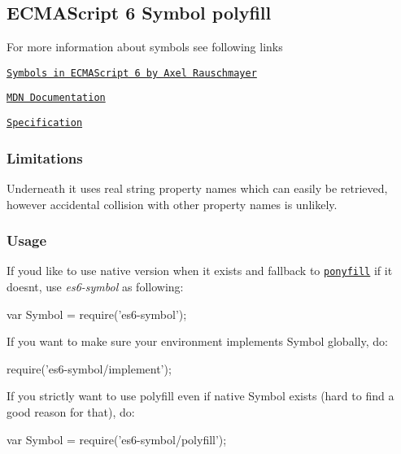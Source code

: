 \subsection*{E\+C\+M\+A\+Script 6 Symbol polyfill}

For more information about symbols see following links
\begin{DoxyItemize}
\item \href{http://www.2ality.com/2014/12/es6-symbols.html}{\tt Symbols in E\+C\+M\+A\+Script 6 by Axel Rauschmayer}
\item \href{https://developer.mozilla.org/en-US/docs/Web/JavaScript/Reference/Global_Objects/Symbol}{\tt M\+DN Documentation}
\item \href{http://people.mozilla.org/~jorendorff/es6-draft.html#sec-symbol-constructor}{\tt Specification}
\end{DoxyItemize}

\subsubsection*{Limitations}

Underneath it uses real string property names which can easily be retrieved, however accidental collision with other property names is unlikely.

\subsubsection*{Usage}

If you\textquotesingle{}d like to use native version when it exists and fallback to \href{https://ponyfill.com}{\tt ponyfill} if it doesn\textquotesingle{}t, use {\itshape es6-\/symbol} as following\+:


\begin{DoxyCode}
var Symbol = require('es6-symbol');
\end{DoxyCode}


If you want to make sure your environment implements {\ttfamily Symbol} globally, do\+:


\begin{DoxyCode}
require('es6-symbol/implement');
\end{DoxyCode}


If you strictly want to use polyfill even if native {\ttfamily Symbol} exists (hard to find a good reason for that), do\+:


\begin{DoxyCode}
var Symbol = require('es6-symbol/polyfill');
\end{DoxyCode}


